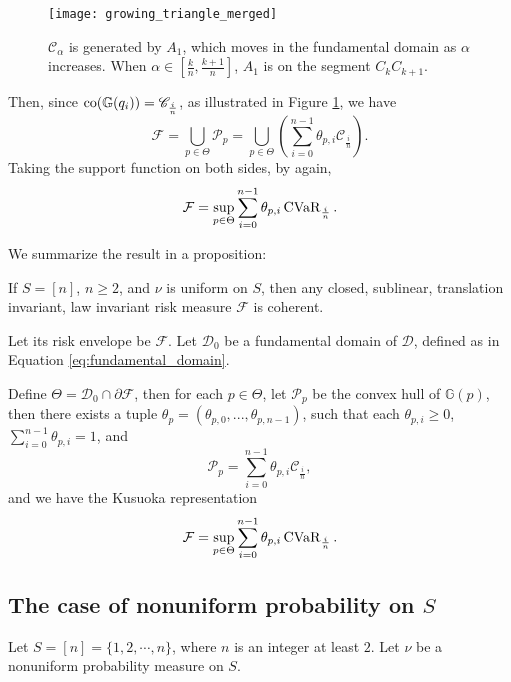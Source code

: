 \begin{figure}[h]
	\centering
	\texttt{[image: growing\_triangle\_merged]}
	\caption{\(\mathscr{C}_\alpha\) is generated by \(A_1\), which moves in the fundamental domain as \(\alpha\) increases. When \(\alpha\in [\frac{k}{n}, \frac{k+1}{n}]\), \(A_1\) is on the segment \(C_kC_{k+1}\).}
	\label{fig:growing_triangle_merged}
\end{figure}

Then, since $\operatorname*{co}(\mathbb{G}(q_i)) = \mathscr{C}_{\frac i n}$, as illustrated in Figure \ref{fig:growing_triangle_merged}, we have
$$
\mathscr{F} = \bigcup_{p\in\Theta}\mathscr{P}_p = \bigcup_{p\in\Theta} \left(\sum_{i = 0}^{n-1}\theta_{p, i} \mathscr{C}_{\frac in} \right).
$$
Taking the support function on both sides, by \cite[Table 3.3.1]{hiriart-urrutyFundamentalsConvexAnalysis2001} again, 
$$
\mathcal{F} = \sup_{p\in\Theta} \sum_{i = 0}^{n-1}\theta_{p, i} \operatorname{CVaR}_{\frac in}.
$$

We summarize the result in a proposition:

\begin{prop}
	If $S = [n]$, $ n \ge 2$, and $\nu$ is uniform on $S$, then any closed, sublinear, translation invariant, law invariant risk measure $\mathcal{F}$ is coherent. 
	
	Let its risk envelope be $\mathscr{F}$. Let $\mathscr{D}_0$ be a fundamental domain of $\mathscr{D}$, defined as in Equation \ref{eq:fundamental_domain}.
	 
	Define $\Theta = \mathscr{D}_0 \cap \partial \mathscr{F}$, then for each $p \in \Theta$, let $\mathscr{P}_p$ be the convex hull of $\mathbb{G}(p)$, then there exists a tuple $\theta_p = (\theta_{p, 0}, ..., \theta_{p, n-1})$, such that each $\theta_{p, i} \ge 0$, $\sum_{i = 0}^{n-1}\theta_{p, i} = 1$, and
	\begin{equation}
	\mathscr{P}_p = \sum_{i = 0}^{n-1}\theta_{p, i} \mathscr{C}_{\frac in},
	\end{equation}
	and we have the Kusuoka representation 
	\begin{equation}
	\mathcal{F} = \sup_{p\in\Theta} \sum_{i = 0}^{n-1}\theta_{p, i} \operatorname{CVaR}_{\frac in}.
	\end{equation}
\end{prop}

\subsection{The case of nonuniform probability on \(S\)}
\label{sec:nonuniform_space}
Let \(S = [n]= \{1, 2, \cdots , n\} \), where \(n \) is an integer at least \(2\). Let \(\nu\) be a nonuniform probability measure on \(S\). 

